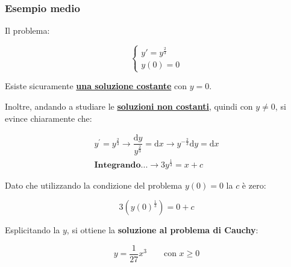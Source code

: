 \documentclass[a4paper]{article}
\begin{document}
	\subsubsection[Esempio medio]{\textcolor{Green4}{\textbf{Esempio medio}}}
	
	\noindent
	Il problema:
	
	\begin{equation*}
		\begin{cases}
			y' = y^{\frac{2}{3}} \\
			y\left(0\right) = 0
		\end{cases}
	\end{equation*}
	
	\noindent
	Esiste sicuramente \textbf{\underline{una soluzione costante}} con $y = 0$.
	
	Inoltre, andando a studiare le \textbf{\underline{soluzioni non costanti}}, quindi con $y \ne 0$, si evince chiaramente che:
	
	\begin{gather*}
		y^{'} = y^{\frac{2}{3}} \longrightarrow
		\dfrac{\mathrm{d}y}{y^{\frac{2}{3}}} = \mathrm{d}x \longrightarrow
		y^{-\frac{2}{3}} \mathrm{d}y = \mathrm{d}x \\
		\textbf{Integrando...} \longrightarrow
		3y^{\frac{1}{3}} = x + c
	\end{gather*}

	\noindent
	Dato che utilizzando la condizione del problema $y\left(0\right) = 0$ la $c$ è zero:
	
	\begin{equation*}
		3\left(y\left(0\right)^{\frac{1}{3}}\right) = 0 + c
	\end{equation*}

	\noindent
	Esplicitando la $y$, si ottiene la \textbf{soluzione al problema di Cauchy}:
	
	\begin{equation*}
		y = \dfrac{1}{27} x^{3} \hspace{2em} \text{con } x \ge 0
	\end{equation*}

	\newpage
\end{document}
